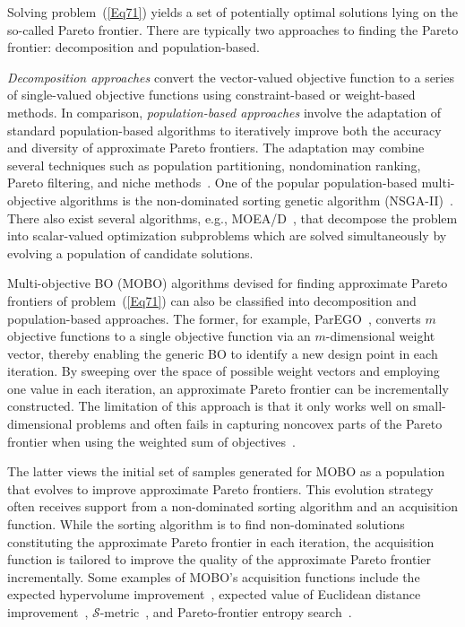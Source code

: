 \documentclass[iicol,sn-basic]{sn-jnl}%
\begin{document}
Solving problem~(\ref{Eq71}) yields a set of potentially optimal solutions lying on the so-called Pareto frontier.
There are typically two approaches to finding the Pareto frontier: decomposition and population-based.

\textit{Decomposition approaches} convert the vector-valued objective function to a series of single-valued objective functions using constraint-based or weight-based methods.
In comparison, \textit{population-based approaches} involve the adaptation of standard population-based algorithms to iteratively improve both the accuracy and diversity of approximate Pareto frontiers. The adaptation may combine several techniques such as population partitioning, nondomination ranking, Pareto filtering, and niche methods~\citep{Kochenderfer2019}. 
One of the popular population-based multi-objective algorithms is the non-dominated sorting genetic algorithm (NSGA-II)~\citep{Deb2002}.
There also exist several algorithms, e.g., MOEA/D~\citep{ZhangQ2007}, that decompose the problem into scalar-valued optimization subproblems which are solved simultaneously by evolving a population of candidate solutions. 

Multi-objective BO (MOBO) algorithms devised for finding approximate Pareto frontiers of problem~(\ref{Eq71}) can also be classified into decomposition and population-based approaches.
The former, for example, ParEGO~\citep{Knowles2006}, converts $m$ objective functions to a single objective function via an $m$-dimensional weight vector, thereby enabling the generic BO to identify a new design point in each iteration.
By sweeping over the space of possible weight vectors and employing one value in each iteration, an approximate Pareto frontier can be incrementally constructed.
The limitation of this approach is that it only works well on small-dimensional problems and often fails in capturing noncovex parts of the Pareto frontier when using the weighted sum of objectives~\citep{Das1997}.

The latter views the initial set of samples generated for MOBO as a population that evolves to improve approximate Pareto frontiers.
This evolution strategy often receives support from a non-dominated sorting algorithm and an acquisition function.
While the sorting algorithm is to find non-dominated solutions constituting the approximate Pareto frontier in each iteration, the acquisition function is tailored to improve the quality of the approximate Pareto frontier incrementally.
Some examples of MOBO's acquisition functions include the expected hypervolume improvement~\citep{Emmerich2006}, expected value of Euclidean distance improvement~\citep{Keane2006}, $\mathcal{S}$-metric~\citep{Ponweiser2008}, and Pareto-frontier entropy search~\citep{Suzuki2020}.
\end{document}
